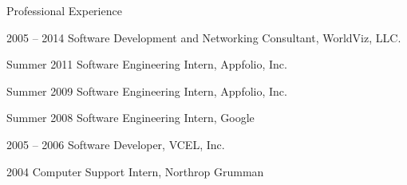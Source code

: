 \begin{vitae}
{\pagebreak

\begin{vitaesection}{Professional Experience}
  \item [2005 -- 2014] Software Development and Networking Consultant,
    WorldViz, LLC.
  \item [Summer 2011] Software Engineering Intern, Appfolio, Inc.
  \item [Summer 2009] Software Engineering Intern, Appfolio, Inc.
  \item [Summer 2008] Software Engineering Intern, Google
  \item [2005 -- 2006] Software Developer, VCEL, Inc.
  \item [2004] Computer Support Intern, Northrop Grumman
\end{vitaesection}

}
\end{vitae}
